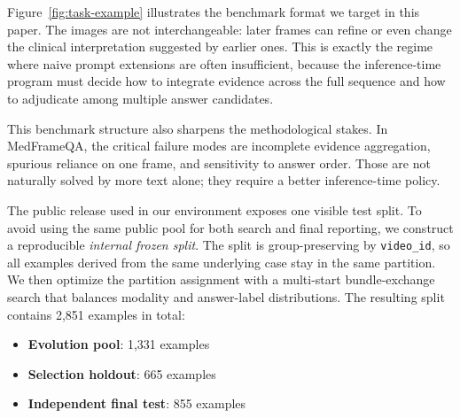 \documentclass[11pt]{article}
\begin{document}
Figure~\ref{fig:task-example} illustrates the benchmark format we target in this paper. The images are not interchangeable: later frames can refine or even change the clinical interpretation suggested by earlier ones. This is exactly the regime where naive prompt extensions are often insufficient, because the inference-time program must decide how to integrate evidence across the full sequence and how to adjudicate among multiple answer candidates.

This benchmark structure also sharpens the methodological stakes. In MedFrameQA, the critical failure modes are incomplete evidence aggregation, spurious reliance on one frame, and sensitivity to answer order. Those are not naturally solved by more text alone; they require a better inference-time policy.

The public release used in our environment exposes one visible test split. To avoid using the same public pool for both search and final reporting, we construct a reproducible \emph{internal frozen split}. The split is group-preserving by \texttt{video\_id}, so all examples derived from the same underlying case stay in the same partition. We then optimize the partition assignment with a multi-start bundle-exchange search that balances modality and answer-label distributions. The resulting split contains 2,851 examples in total:
\begin{itemize}[leftmargin=1.5em]
    \item \textbf{Evolution pool}: 1,331 examples
    \item \textbf{Selection holdout}: 665 examples
    \item \textbf{Independent final test}: 855 examples
\end{itemize}

\begin{table}[t]
\centering
{}
\caption{Internal frozen split used throughout the paper. All methods share the same group-preserving split by \texttt{video\_id}.}
\label{tab:split-summary}
\end{table}
\end{document}
